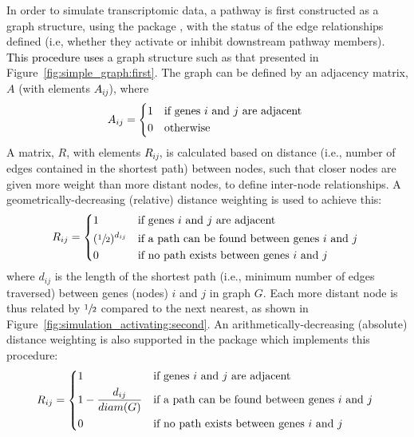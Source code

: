 \documentclass[article, shortnames]{jss}
\begin{document}
In order to simulate transcriptomic data, a pathway is first constructed as a graph structure, using the   package \citep{igraph}, with the status of the edge relationships defined (i.e, whether they activate or inhibit downstream pathway members). 
%
\textcolor{black}{This procedure uses} a graph structure such as that presented in Figure~\ref{fig:simple_graph:first}. The graph can be defined by an adjacency matrix, \textbf{$A$} (with elements \textcolor{black}{$A_{ij}$}), where  \textcolor{black}{
%
\[
A_{ij} = 
\begin{dcases*}
   1                         & if genes $i$ and $j$ are adjacent \\
   0                         & otherwise
\end{dcases*}
\]}
%
\noindent
A matrix, \textbf{$R$}, with elements \textcolor{black}{$R_{ij}$}, is calculated based on distance (i.e., number of edges contained in the shortest path) between nodes, such that closer nodes are given more weight than more distant nodes, to define inter-node relationships. A geometrically-decreasing (relative) distance weighting is used to achieve this: \textcolor{black}{
%
\[
R_{ij} = 
\begin{dcases*}
   1                            & if genes $i$ and $j$ are adjacent \\
   (\sfrac{1}{2})^{d_{ij}}      & if a path can be found  between genes $i$ and $j$ \\
   0                            & if no path exists between genes $i$ and $j$ 
\end{dcases*}
\]}
%
\noindent
where $d_{ij}$ is the length of the shortest path (i.e., minimum number of edges traversed) between genes (nodes) $i$ and $j$ in graph $G$. Each more distant node is thus related by $\sfrac{1}{2}$ compared to the next nearest, as shown in Figure~\ref{fig:simulation_activating:second}.
An arithmetically-decreasing (absolute) distance weighting is also supported in the   package which implements this procedure: \textcolor{black}{
%
\[
R_{ij} = 
\begin{dcases*}
   1                            & if genes $i$ and $j$ are adjacent \\
   1-\frac{d_{ij}}{diam(G)}     & if a path can be found  between genes $i$ and $j$ \\
   0                            & if no path exists between genes $i$ and $j$ 
\end{dcases*}
\]
%
}
\end{document}
